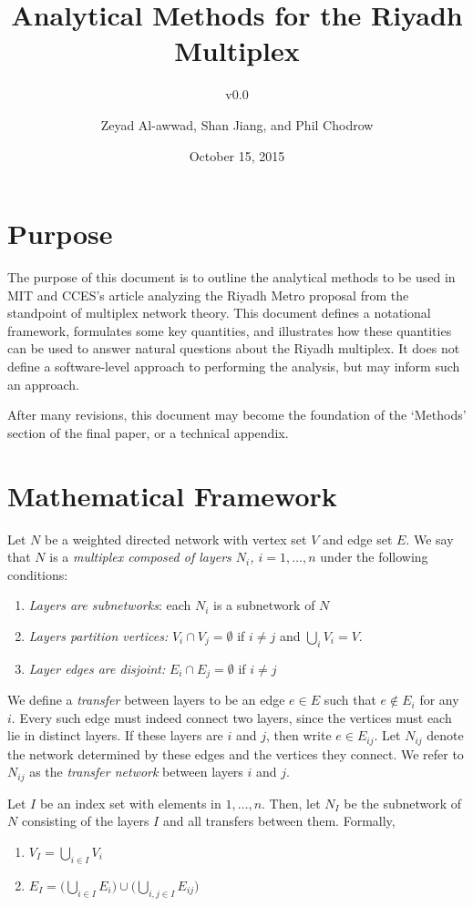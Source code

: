 \documentclass[english]{scrartcl}
\title{Analytical Methods for the Riyadh Multiplex}
\subtitle{v0.0}
\author{Zeyad Al-awwad, Shan Jiang, and Phil Chodrow}
\date{October 15, 2015}
\begin{document}
\maketitle

\section{Purpose}

	The purpose of this document is to outline the analytical methods to be used in MIT and CCES's article analyzing the Riyadh Metro proposal from the standpoint of multiplex network theory. This document defines a notational framework, formulates some key quantities, and illustrates how these quantities can be used to answer natural questions about the Riyadh multiplex. It does not define a software-level approach to performing the analysis, but may inform such an approach. 

	After many revisions, this document may become the foundation of the `Methods' section of the final paper, or a technical appendix. 

\section{Mathematical Framework}

	Let $N$ be a weighted directed network with vertex set $V$ and edge set $E$. We say that $N$ is a \emph{multiplex composed of layers $N_i$, $i = 1,\ldots,n$ } under the following conditions:
	\begin{enumerate}
		\item \emph{Layers are subnetworks}: each $N_i$ is a subnetwork of $N$
		\item \emph{Layers partition vertices:} $V_i \cap V_j = \emptyset$ if $i \neq j$ and  $\bigcup_i V_i = V$.
		\item \emph{Layer edges are disjoint:} $E_i \cap E_j = \emptyset$ if $i \neq j$
	\end{enumerate}
	We define a \emph{transfer} between layers to be an edge $e\in E$ such that $e\notin E_i$ for any $i$. Every such edge must indeed connect two layers, since the vertices must each lie in distinct layers. If these layers are $i$ and $j$, then write $e\in E_{ij}$. Let $N_{ij}$ denote the network determined by these edges and the vertices they connect. We refer to $N_{ij}$ as the \emph{transfer network} between layers $i$ and $j$. 

	Let $I$ be an index set with elements in $1,\ldots, n$. Then, let $N_I$ be the subnetwork of $N$ consisting of the layers $I$ and all transfers between them. Formally, 
	\begin{enumerate}
		\item $V_I = \bigcup_{i\in I} V_i$
		\item $E_I = \bigg(\bigcup_{i\in I} E_i\bigg) \cup \bigg(\bigcup_{i,j\in I} E_{ij}\bigg)$
	\end{enumerate}
\end{document}

